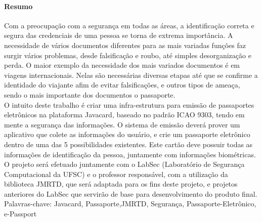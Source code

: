 \documentclass{article}
\begin{document}
	\paragraph{\large Resumo}
		\begin{justify}
			\hspace{2cm} Com a preocupação com a segurança em todas as áreas, a identificação correta e segura das credenciais de uma pessoa se torna de extrema importância. A necessidade de vários documentos diferentes para as mais variadas funções faz surgir vários problemas, desde falsificação e roubo, até simples desorganização e perda.
O maior exemplo da necessidade dos mais variados documentos é em viagens internacionais. Nelas são necessárias diversas etapas até que se confirme a identidade do viajante afim de evitar falsificações, e outros tipos de ameaça, sendo o mais importante dos documentos o passaporte.\\
			\hspace*{2cm} O intuito deste trabalho é criar uma infra-estrutura para emissão de passaportes eletrônicos na plataforma Javacard, baseado no padrão ICAO 9303, tendo em mente a segurança das informações. O sistema de emissão deverá prover um aplicativo que colete as informações do usuário, e crie um passaporte eletrônico dentro de uma das 5 possibilidades existentes.
Este cartão deve possuir todas as informações de identificação da pessoa, juntamente com informações biométricas. 
O projeto será efetuado juntamente com o LabSec (Laboratório de Segurança Computacional da UFSC) e o professor responsável, com a utilização da biblioteca JMRTD, que será adaptada para os fins deste projeto, e projetos anteriores do LabSec que servirão de base para desenvolvimento do produto final. \\
	
	\vspace*{10px}
Palavras-chave: Javacard, Passaporte,JMRTD, Segurança, Passaporte-Eletrônico, e-Passport
		\end{justify}
\end{document}

